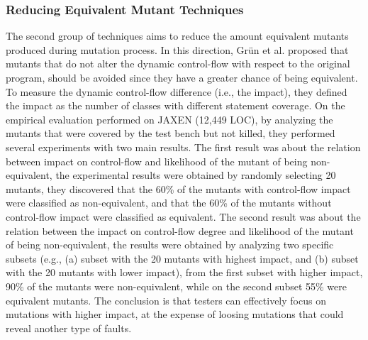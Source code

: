 


\subsubsection{Reducing Equivalent Mutant Techniques}

The second group of techniques aims to reduce the amount equivalent mutants produced during mutation process.
In this direction, Gr\"{u}n et al. \cite{grun2009impact} proposed that mutants that do not alter the dynamic control-flow with respect to the original program, should be avoided since they have a greater chance of being equivalent. To measure the dynamic control-flow difference (i.e., the impact), they defined the impact as the number of classes with different statement coverage. On the empirical evaluation performed on JAXEN (12,449 LOC), by analyzing the mutants that were covered by the test bench but not killed, they performed several experiments with two main results. 
The first result was about the relation between impact on control-flow and likelihood of the mutant of being non-equivalent, the experimental results were obtained by randomly selecting 20 mutants, they discovered that the 60\% of the mutants with control-flow impact were classified as non-equivalent, and that the 60\% of the mutants without control-flow impact were classified as equivalent. 
The second result was about the relation between the impact on control-flow degree and likelihood of the mutant of being non-equivalent, the results were obtained by analyzing two specific subsets (e.g., (a) subset with the 20 mutants with highest impact, and (b) subset with the 20 mutants with lower impact), from the first subset with higher impact, 90\% of the mutants were non-equivalent, while on the second subset 55\% were equivalent mutants. The conclusion is that testers can effectively focus on mutations with higher impact, at the expense of loosing mutations that could reveal another type of faults.

